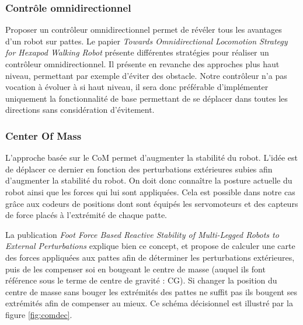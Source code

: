\documentclass{tnreport}
\begin{document}
\subsubsection{Contrôle omnidirectionnel}

Proposer un contrôleur omnidirectionnel permet de révéler tous les avantages d'un robot sur pattes. Le papier \textit{Towards Omnidirectional Locomotion Strategy 
for Hexapod Walking Robot} \cite{seljanko_towards_2011} présente différentes stratégies pour réaliser un contrôleur omnidirectionnel. Il présente en revanche des approches plus haut niveau, permettant par exemple d'éviter des obstacle. Notre contrôleur n'a pas vocation à évoluer à si haut niveau, il sera donc préférable d'implémenter uniquement la fonctionnalité de base permettant de se déplacer dans toutes les directions sans considération d'évitement. 

\subsubsection{Center Of Mass}
L'approche basée sur le \gls{CoM} permet d'augmenter la stabilité du robot. L'idée est de déplacer ce dernier en fonction des perturbations extérieures subies afin d'augmenter la stabilité du robot. On doit donc connaître la posture actuelle du robot ainsi que les forces qui lui sont appliquées. Cela est possible dans notre cas grâce aux codeurs de positions dont sont équipés les servomoteurs et des capteurs de force placés à l'extrémité de chaque patte.

La publication \textit{Foot Force Based Reactive Stability of Multi-Legged Robots
to External Perturbations} \cite{agheli_foot_2015} explique bien ce concept, et propose de calculer une carte des forces appliquées aux pattes afin de déterminer les perturbations extérieures, puis de les compenser soi en bougeant le centre de masse (auquel ils font référence sous le terme de centre de gravité : CG). Si changer la position du centre de masse sans bouger les extrémités des pattes ne suffit pas ils bougent ses extrémités afin de compenser au mieux. Ce schéma décisionnel est illustré par la figure \ref{fig:comdec}.
\end{document}
